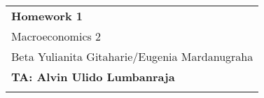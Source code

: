 \documentclass[letter,11pt]{article}
\begin{document}
\thispagestyle{empty} %
\begin{tabular}{p{17cm}} %
{\large \bf Homework 1} \\
Macroeconomics 2 \\ Beta Yulianita Gitaharie/Eugenia Mardanugraha  \\ {\bf{TA: Alvin Ulido Lumbanraja}}\\
\hline %
\\
\end{tabular} %
\vspace*{0.3cm} %
\end{document}
